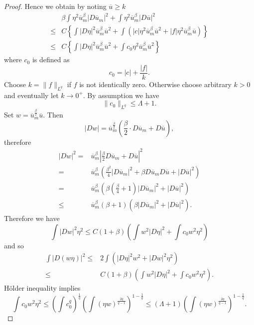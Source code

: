 \begin{proof}
Hence we obtain by noting $\overline{u}\ge k$
\begin{align*}
  &\beta\int \eta^2\overline{u}_m^{\beta}\left| D\overline{u}_m \right| ^2+\int\eta^2\overline{u}_m^{\beta}\left| D\overline{u} \right| ^2\\
  \le & C\left\{ \int\left| D\eta \right| ^2\overline{u}_m^{\beta}\overline{u}^2+\int\left( \left| c \right| \eta^2\overline{u}_m^{\beta}\overline{u}^2+\left| f \right| \eta^2\overline{u}_m^{\beta}\overline{u} \right)  \right\}\\
  \le & C\left\{ \int\left| D\eta \right| ^2\overline{u}_m^{\beta}\overline{u}^2+\int c_0\eta^2\overline{u}_m^{\beta}\overline{u}^2 \right\} 
\end{align*}
where $c_0$ is defined as 
\[
  c_0=\left| c \right| +\frac{\left| f \right| }{k}.
\] 
Choose $k=\|f\|_{L^{q}}$ if $f$ is not identically zero. Otherwise choose arbitrary $k>0$ and eventually let $k\to 0^{+}$. 
By assumption we have 
\[
\|c_0\|_{L^{q}}\le \Lambda +1.
\] 
Set $w=\overline{u}_m^{\frac{\beta}{2}}\overline{u}$. Then 
\[
  \left| Dw \right| =\overline{u}_m^{\frac{\beta}{2}}\left( \frac{\beta}{2}\cdot D\overline{u}_m+D\overline{u} \right) ,
\] 
therefore
\begin{align*}
  \left| Dw \right| ^2=&\overline{u}_m^{\beta}\left| \frac{\beta}{2}D\overline{u}_m+D\overline{u} \right| ^2\\
  =& \overline{u}_m^{\beta}\left( \frac{\beta^2}{4}\left| D\overline{u}_m \right| ^2+\beta D\overline{u}_mD\overline{u}+\left| D\overline{u} \right| ^2 \right) \\
  =& \overline{u}_m^{\beta}\left( \beta\left( \frac{\beta}{4}+1 \right) \left| D\overline{u}_m \right| ^2+\left| D\overline{u} \right| ^2 \right) \\
  \le & \overline{u}_m^{\beta}\left( \beta+1 \right) \left( \beta \left| D\overline{u}_m \right| ^2+\left| D\overline{u} \right| ^2 \right) 
.\end{align*}
Therefore we have 
\[
  \int\left| Dw \right| ^2\eta^2\le  C(1+\beta)\left( \int w^2\left| D\eta \right| ^2+\int c_0w^2\eta^2 \right) 
\] 
and so
\begin{align*}
  \int \left| D(w\eta) \right| ^2\le & 2\int\left( \left| D\eta \right| ^2w^2+\left| Dw \right| ^2\eta^2 \right) \\
  \le  & C(1+\beta) \left( \int w^2 \left| D\eta \right| ^2+ \int c_0w^2\eta^2 \right) .
\end{align*}
 H\"{o}lder inequality implies 
 \[
   \int c_0 w^2\eta^2\le \left( \int c_0^{q} \right) ^{\frac{1}{q}}\left( \int \left( \eta w \right) ^{\frac{2q}{q-1}} \right) ^{1-\frac{1}{q}}\le \left( \Lambda+1 \right) \left( \int (\eta w)^{\frac{2q}{q-1}} \right) ^{1-\frac{1}{q}}.
\]
\end{proof}
